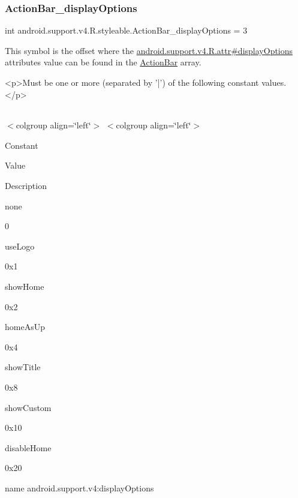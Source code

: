 \subsubsection{\texorpdfstring{Action\+Bar\+\_\+display\+Options}{ActionBar\_displayOptions}}
{\footnotesize\ttfamily int android.\+support.\+v4.\+R.\+styleable.\+Action\+Bar\+\_\+display\+Options = 3\hspace{0.3cm}{\ttfamily [static]}}

This symbol is the offset where the \hyperlink{classandroid_1_1support_1_1v4_1_1R_1_1attr_abdf70ff300a74ad07128090995bf91a5}{android.\+support.\+v4.\+R.\+attr\#display\+Options} attribute\textquotesingle{}s value can be found in the \hyperlink{classandroid_1_1support_1_1v4_1_1R_1_1styleable_adc5a3492b9c46265760d7120a04d6afa}{Action\+Bar} array.

\begin{DoxyVerb}      <p>Must be one or more (separated by '|') of the following constant values.</p>
\end{DoxyVerb}
 \tabulinesep=1mm
\begin{longtabu} spread 0pt [c]{*{0}{|X[-1]}|}
\hline
\end{longtabu}
$<$colgroup align=\char`\"{}left\char`\"{}$>$ $<$colgroup align=\char`\"{}left\char`\"{}$>$ 

Constant

Value

Description 

{\ttfamily none}

0

{\ttfamily use\+Logo}

0x1

{\ttfamily show\+Home}

0x2

{\ttfamily home\+As\+Up}

0x4

{\ttfamily show\+Title}

0x8

{\ttfamily show\+Custom}

0x10

{\ttfamily disable\+Home}

0x20

name android.\+support.\+v4\+:display\+Options \mbox{\label{classandroid_1_1support_1_1v4_1_1R_1_1styleable_ac3707487601420af47218613124bf864}} 
